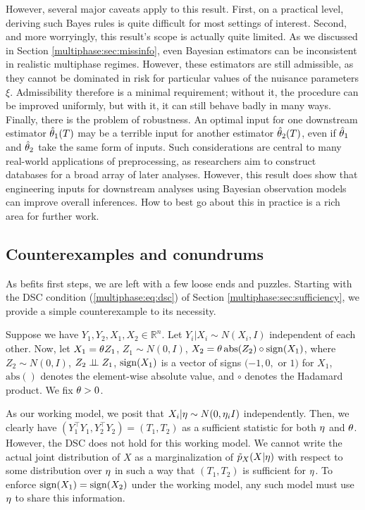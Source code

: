 However, several major caveats apply to this result.
First, on a practical level, deriving such Bayes rules is quite difficult for most settings of interest.
%
Second, and more worryingly, this result's scope is actually quite limited.
As we discussed in Section \ref{multiphase:sec:missinfo}, even Bayesian estimators can be inconsistent in realistic multiphase regimes.
However, these estimators are still admissible, as they cannot be dominated in risk for particular values of the nuisance parameters $\xi$.
Admissibility therefore  is  a minimal requirement; without it, the procedure can be improved uniformly, but with it, it can still behave badly in many ways. Finally, there is the problem of robustness.
An optimal input for one downstream estimator $\hat{\theta}_1(T)$ may be a terrible input for another estimator $\hat{\theta}_2(T)$, even if $\hat{\theta}_1$ and $\hat{\theta}_2$ take the same form of inputs.
Such considerations are central to many real-world applications of preprocessing, as researchers aim to construct databases for a broad array of later analyses.
%
However, this result does show that engineering inputs for downstream analyses using Bayesian observation models can improve overall inferences.
How to best go about this in practice is a rich area for further work.

\subsection{Counterexamples and conundrums}
\label{multiphase:sec:counterexamples}

As befits first steps, we are left with a few loose ends and puzzles.
Starting with the DSC condition (\ref{multiphase:eq:dsc}) of Section \ref{multiphase:sec:sufficiency}, we provide a  simple counterexample to its necessity.

Suppose we have $Y_1,  Y_2,  X_1,  X_2 \in \mathbb{R}^n$. Let $ Y_i |  X_i \sim N(X_i, I)$ independent of each other.
Now, let $X_1 = \theta Z_1$, $Z_1 \sim N(0, I)$, $X_2 = \theta \, \mathrm{abs}(Z_2) \circ \operatorname{sign}(X_1)$, where $Z_2 \sim N(0, I)$, $Z_2 \perp\!\!\!\perp Z_1$, $\operatorname{sign}(X_1)$ is a vector of signs $(-1, 0,$ or $1)$ for $X_1$, $\mathrm{abs}()$ denotes the element-wise absolute value, and $\circ$ denotes the Hadamard product.
We fix $\theta > 0$.

As our working model, we posit that $X_i |\eta \sim N(0, \eta_i I)$ independently.
Then, we clearly have $(Y_1^\top Y_1, Y_2^\top Y_2) = (T_1, T_2)$ as a sufficient statistic for both $\eta$ and $\theta$.
However, the DSC does not hold for this working model.
We cannot write the actual joint distribution of $X$ as a marginalization of $\tilde{p}_X(X |\eta)$ with respect to some distribution over $\eta$ in such a way that $(T_1, T_2)$ is sufficient for $\eta$.
To enforce $\operatorname{sign}(X_1) = \operatorname{sign}(X_2)$ under the working model, any such model must use $\eta$ to share this information.

